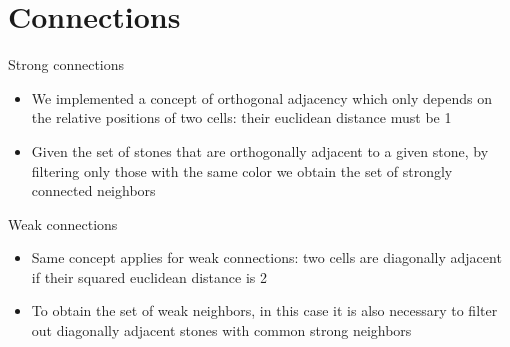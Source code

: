 \documentclass{beamer}
\begin{document}
\section{Connections}

\begin{frame}{Strong connections}
	\begin{itemize}
		\item We implemented a concept of orthogonal adjacency which only depends on the relative positions of two cells: their euclidean distance must be 1
		\item Given the set of stones that are orthogonally adjacent to a given stone, by filtering only those with the same color we obtain the set of strongly connected neighbors
	\end{itemize}
	
\end{frame}

\begin{frame}{Weak connections}
	\begin{itemize}
		\item Same concept applies for weak connections: two cells are diagonally adjacent if their squared euclidean distance is 2	
		\item To obtain the set of weak neighbors, in this case it is also necessary to filter out diagonally adjacent stones with common strong neighbors
	\end{itemize}
\end{frame}
\end{document}
